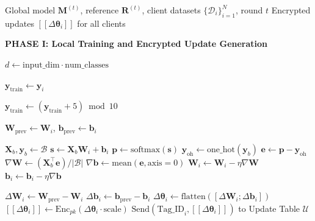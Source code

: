 \documentclass[10pt,journal,compsoc]{IEEEtran}
\begin{document}
\begin{algorithm}[H]
\caption{FIP-FL Per-Round Verification Protocol (Part 1: Local Training)}
\label{alg:round1}
\begin{algorithmic}[1]
\Require Global model $\mathbf{M}^{(t)}$, reference $\mathbf{R}^{(t)}$, client datasets $\{\mathcal{D}_i\}_{i=1}^N$, round $t$
\Ensure Encrypted updates $[\![\Delta\bm{\theta}_i]\!]$ for all clients

\Statex \textbf{PHASE I: Local Training and Encrypted Update Generation}

\State $d \gets \text{input\_dim} \cdot \text{num\_classes}$ 

    \State $\mathbf{y}_{\text{train}} \gets \mathbf{y}_i$
    
        \State $\mathbf{y}_{\text{train}} \gets (\mathbf{y}_{\text{train}} + 5) \bmod 10$ 
    \EndIf
    
    \State $\mathbf{W}_{\text{prev}} \gets \mathbf{W}_i$, $\mathbf{b}_{\text{prev}} \gets \mathbf{b}_i$
    
            \State $\mathbf{X}_b, \mathbf{y}_b \gets \mathcal{B}$
            \State $\mathbf{s} \gets \mathbf{X}_b \mathbf{W}_i + \mathbf{b}_i$
            \State $\mathbf{p} \gets \text{softmax}(\mathbf{s})$
            \State $\mathbf{y}_{\text{oh}} \gets \text{one\_hot}(\mathbf{y}_b)$
            \State $\mathbf{e} \gets \mathbf{p} - \mathbf{y}_{\text{oh}}$
            \State $\nabla \mathbf{W} \gets (\mathbf{X}_b^\top \mathbf{e}) / |\mathcal{B}|$
            \State $\nabla \mathbf{b} \gets \text{mean}(\mathbf{e}, \text{axis}=0)$
            \State $\mathbf{W}_i \gets \mathbf{W}_i - \eta \nabla \mathbf{W}$
            \State $\mathbf{b}_i \gets \mathbf{b}_i - \eta \nabla \mathbf{b}$
        \EndFor
    \EndFor
    
    \State $\Delta \mathbf{W}_i \gets \mathbf{W}_{\text{prev}} - \mathbf{W}_i$
    \State $\Delta \mathbf{b}_i \gets \mathbf{b}_{\text{prev}} - \mathbf{b}_i$
    \State $\Delta \bm{\theta}_i \gets \text{flatten}([\Delta \mathbf{W}_i; \Delta \mathbf{b}_i])$
    \State $[\![\Delta \bm{\theta}_i]\!] \gets \text{Enc}_{pk}(\Delta \bm{\theta}_i \cdot \text{scale})$
    \State $\text{Send}(\text{Tag\_ID}_i, [\![\Delta \bm{\theta}_i]\!])$ to Update Table $\mathcal{U}$
\EndFor
\end{algorithmic}
\end{algorithm}
\end{document}
